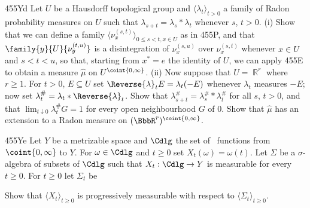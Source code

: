 {\spheader 455Yd Let $U$ be  a Hausdorff topological group and
$\langle\lambda_t\rangle_{t>0}$ a family of Radon probability measures on
$U$ such that $\lambda_{s+t}=\lambda_s*\lambda_t$ whenever $s$, $t>0$.
(i) Show that we can define a family
$\langle\nu_x^{(s,t)}\rangle_{0\le s<t,x\in U}$ as in 455P, and that
$\family{y}{U}{\nu_y^{(t,u)}}$ is a disintegration of $\nu_x^{(s,u)}$ over
$\nu_x^{(s,t)}$ whenever $x\in U$ and $s<t<u$, so that, starting from
$x^*=e$ the identity of $U$, we can apply 455E to obtain a measure
$\hat\mu$ on $U^{\coint{0,\infty}}$.   (ii) Now suppose that $U=\BbbR^r$
where $r\ge 1$.
For $t>0$, $E\subseteq U$ set $\Reverse{\lambda}_tE=\lambda_t(-E)$
whenever  $\lambda_t$ measures $-E$;  now set
$\lambda^{\#}_t=\lambda_t*\Reverse{\lambda}_t$.   Show that
$\lambda^{\#}_{s+t}=\lambda^{\#}_s*\lambda^{\#}_t$ for all $s$, $t>0$, and
that $\lim_{t\downarrow 0}\lambda^{\#}_tG=1$ for every
open neighbourhood $G$ of $0$.   Show that $\hat\mu$ has an extension to a
Radon measure on $(\BbbR^r)^{\coint{0,\infty}}$.

\spheader 455Ye Let $Y$ be a metrizable
space and $\Cdlg$ the set of \cadlag\ functions from $\coint{0,\infty}$ to
$Y$.   For $\omega\in\Cdlg$ and $t\ge 0$ set $X_t(\omega)=\omega(t)$.
Let $\Sigma$ be a $\sigma$-algebra of subsets of $\Cdlg$ such that
$X_t:\Cdlg\to Y$ is measurable for every $t\ge 0$.
For $t\ge 0$ let $\Sigma_t$ be


\noindent Show that
$\langle X_t\rangle_{t\ge 0}$ is progressively measurable with respect
to $\langle\Sigma_t\rangle_{t\ge 0}$.
}%

